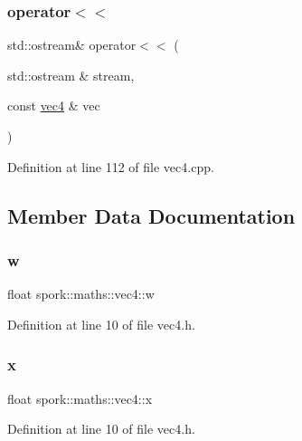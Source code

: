 \subsubsection{\texorpdfstring{operator$<$$<$}{operator<<}}
{\footnotesize\ttfamily std\+::ostream\& operator$<$$<$ (\begin{DoxyParamCaption}\item[{std\+::ostream \&}]{stream,  }\item[{const \hyperlink{structspork_1_1maths_1_1vec4}{vec4} \&}]{vec }\end{DoxyParamCaption})\hspace{0.3cm}{\ttfamily [friend]}}



Definition at line 112 of file vec4.\+cpp.



\subsection{Member Data Documentation}
\mbox{\label{structspork_1_1maths_1_1vec4_ad8bf830957afe6cdf052c4f1d9d0ca45}} 
\subsubsection{\texorpdfstring{w}{w}}
{\footnotesize\ttfamily float spork\+::maths\+::vec4\+::w}



Definition at line 10 of file vec4.\+h.

\mbox{\label{structspork_1_1maths_1_1vec4_a120e501d2f1b38dac84e612abf78c9ed}} 
\subsubsection{\texorpdfstring{x}{x}}
{\footnotesize\ttfamily float spork\+::maths\+::vec4\+::x}



Definition at line 10 of file vec4.\+h.

\mbox{\label{structspork_1_1maths_1_1vec4_a7739a32314dfba099723036cc5b84a98}} 
